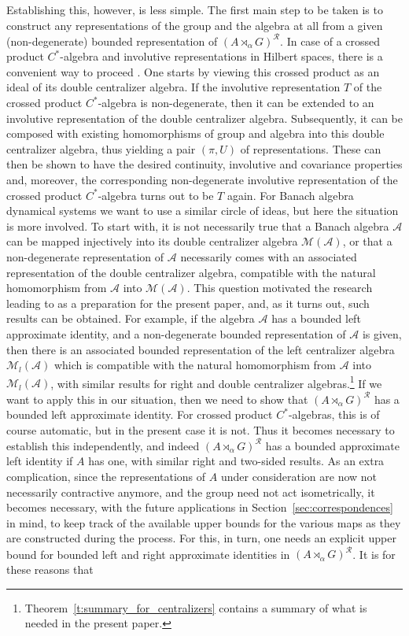 \documentclass{amsart}
\theoremstyle{plain}
\theoremstyle{definition}
\numberwithin{equation}{section}
\begin{document}
Establishing this, however, is less simple. The first main step to be taken is to construct any representations of the group and the algebra at all from a given (non-degenerate) bounded representation of ${(A {\rtimes}_\alpha G)^\mathcal{R}}$. In case of a crossed product $C^*$-algebra and involutive representations in Hilbert spaces, there is a convenient way to proceed \cite{williams}. One starts by viewing this crossed product as an ideal of its double centralizer algebra. If the involutive representation $T$ of the crossed product $C^*$-algebra is non-degenerate, then it can be extended to an involutive representation of the double centralizer algebra. Subsequently, it can be composed with existing homomorphisms of group and algebra into this double centralizer algebra, thus yielding a pair ${(\pi,U)}$ of representations. These can then be shown to have the desired continuity, involutive and covariance properties and, moreover, the corresponding non-degenerate involutive representation of the crossed product $C^*$-algebra turns out to be $T$ again. For Banach algebra dynamical systems we want to use a similar circle of ideas, but here the situation is more involved. To start with, it is not necessarily true that a Banach algebra $\mathcal A$ can be mapped injectively into its double centralizer algebra ${{\mathcal M}(\mathcal A)}$, or that a non-degenerate representation of $\mathcal A$ necessarily comes with an associated representation of the double centralizer algebra, compatible with the natural homomorphism from $\mathcal A$ into ${{\mathcal M}(\mathcal A)}$. This question motivated the research leading to \cite{extendart} as a preparation for the present paper, and, as it turns out, such results can be obtained. For example, if the algebra $\mathcal A$ has a bounded left approximate identity, and a non-degenerate bounded representation of $\mathcal A$ is given, then there is an associated bounded representation of the left centralizer algebra ${{\mathcal M}_l(\mathcal A)}$ which is compatible with the natural homomorphism from $\mathcal A$ into ${{\mathcal M}_l(\mathcal A)}$, with similar results for right and double centralizer algebras.\footnote{Theorem~\ref{t:summary_for_centralizers} contains a summary of what is needed in the present paper.} If we want to apply this in our situation, then we need to show that ${(A {\rtimes}_\alpha G)^\mathcal{R}}$ has a bounded left approximate identity. For crossed product $C^*$-algebras, this is of course automatic, but in the present case it is not. Thus it becomes necessary to establish this independently, and indeed ${(A {\rtimes}_\alpha G)^\mathcal{R}}$ has a bounded approximate left identity if $A$ has one, with similar right and two-sided results. As an extra complication, since the representations of $A$ under consideration are now not necessarily contractive anymore, and the group need not act isometrically, it becomes necessary, with the future applications in Section~\ref{sec:correspondences} in mind, to keep track of the available upper bounds for the various maps as they are constructed during the process. For this, in turn, one needs an explicit upper bound for bounded left and right approximate identities in ${(A {\rtimes}_\alpha G)^\mathcal{R}}$. It is for these reasons that 
\end{document}
